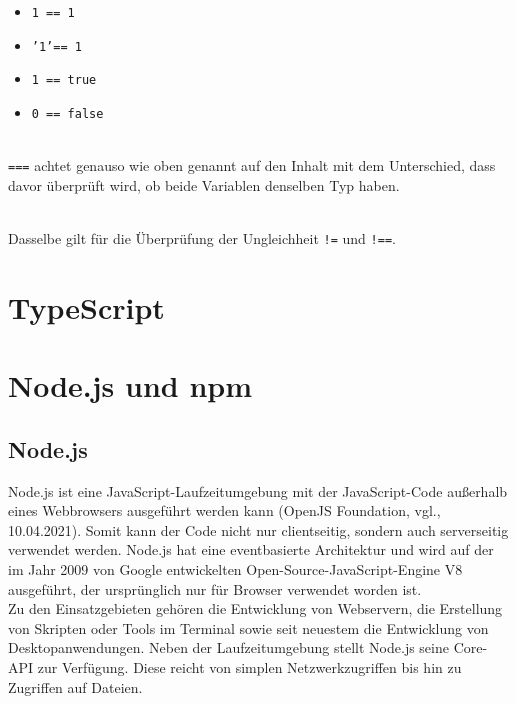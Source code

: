 \begin{itemize}
	\item \texttt{1 == 1}
	\item \texttt{'1'== 1}
	\item \texttt{1 == true}
	\item \texttt{0 == false}
\end{itemize}

\mbox{}\\
\texttt{===} achtet genauso wie oben genannt auf den Inhalt mit dem Unterschied, dass davor überprüft wird, ob beide Variablen denselben Typ haben.

\mbox{}\\
Dasselbe gilt für die Überprüfung der Ungleichheit \texttt{!=} und \texttt{!==}.

\section{TypeScript}

\section{Node.js und npm}

\subsection{Node.js}
Node.js ist eine JavaScript-Laufzeitumgebung mit der JavaScript-Code außerhalb eines Webbrowsers ausgeführt werden kann (OpenJS Foundation, vgl.\cite{nodejs_2021}, 10.04.2021). Somit kann der Code nicht nur clientseitig, sondern auch serverseitig verwendet werden. Node.js hat eine eventbasierte Architektur und wird auf der im Jahr 2009 von Google entwickelten Open-Source-JavaScript-Engine V8 ausgeführt, der ursprünglich nur für Browser verwendet worden ist.\\
Zu den Einsatzgebieten gehören die Entwicklung von Webservern, die Erstellung von Skripten oder Tools im Terminal sowie seit neuestem die Entwicklung von Desktopanwendungen. Neben der Laufzeitumgebung stellt Node.js seine Core-API zur Verfügung. Diese reicht von simplen Netzwerkzugriffen bis hin zu Zugriffen auf Dateien.

